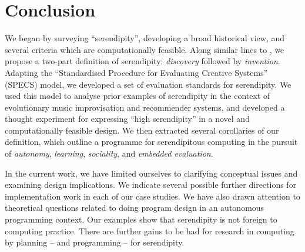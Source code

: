\section{Conclusion} \label{sec:conclusion}

%
We began by surveying ``serendipity'', developing a broad historical
view, and several criteria which are computationally feasible.  Along
similar lines to , we propose a two-part
definition of serendipity: \emph{discovery} followed by
\emph{invention}.
%
Adapting the ``Standardised Procedure for Evaluating Creative
Systems'' (SPECS) model, we developed a set of evaluation standards for
serendipity.
%
We used this model to analyse prior examples of serendipity in the context of evolutionary music improvisation and recommender systems,
and developed a thought experiment for expressing ``high serendipity'' in a novel and computationally feasible design.
%
We then extracted several corollaries of our definition, which outline
a programme for serendipitous computing in the pursuit of
\emph{autonomy}, \emph{learning}, \emph{sociality}, and \emph{embedded
  evaluation}.

In the current work, we have limited ourselves to clarifying conceptual
issues and examining design implications.
% 
We indicate several possible further directions for implementation
work in each of our case studies.  We have also drawn attention to
theoretical questions related to doing program design in an autonomous
programming context.  Our examples show that serendipity is not
foreign to computing practice.  There are further gains to be had for
research in computing by planning -- and programming -- for
serendipity.
%

